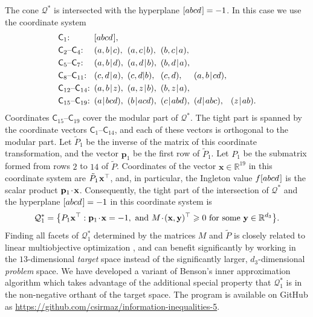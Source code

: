 \documentclass[reqno]{amsart}
\theoremstyle{definition}
\newcommand\tsp{\mkern 1.5mu}
\def\|{\mkern1.5mu{|}\mkern1.5mu}
\renewcommand\ge{\geqslant}\renewcommand\le{\leqslant}
\newcommand\Co{\mathsf C} %
\newcommand\R{\mathbb R}  %
\newcommand\T{\top}       %
\def\m#1{\tsp{#1}\tsp}
\def\abcd{[abcd\tsp]}
\begin{document}
The cone $\mathcal Q^*$ is intersected with the hyperplane $\abcd=-1$.
In this case we use the coordinate system
$$\mathcode`\:="3A\setlength\arraycolsep{2.5pt}%
\begin{array}{llllll}
 \Co_1: & \abcd, \\[3pt]
 \Co_2\mbox{--}\Co_4: & (a,b\|c), & (a,c\|b), & (b,c\|a), \\[3pt]
 \Co_5\mbox{--}\Co_7: & (a,b\|d), & (a,d\|b), & (b,d\|a), \\[3pt]
 \Co_8\mbox{--}\Co_{11}: & (c,d\|a), & (c,d|b),& (c,d), & (a,b\|cd), \\[3pt]
 \Co_{12}\mbox{--}\Co_{14}:& (a,b\|z), & (a,z\|b), & (b,z\|a), \\[3pt]
 \Co_{15}\mbox{--}\Co_{19}: & (a\|bcd), & (b\|acd), & (c\|abd), 
   & (d\|abc), & (z\|ab).
\end{array}$$
Coordinates $\Co_{15}\mbox{--}\Co_{19}$ cover the modular part of $\mathcal
Q^*$. The tight part is spanned by the coordinate vectors
$\Co_1\mbox{--}\Co_{14}$, and each of these vectors is orthogonal to the
modular part. Let $\tilde P_1$ be the inverse of the matrix of this
coordinate transformation, and the vector $\mathbf p_1$ be the first row of
$\tilde P_1$. Let $P_1$ be the submatrix formed from rows $2$ to $14$ of
$\tilde P$. Coordinates of the vector $\mathbf x\in\R^{19}$ in this
coordinate system are $\tilde P_1\tsp \mathbf x^\T$, and, in particular, the
Ingleton value $f\abcd$ is the scalar product $\mathbf p_1\m\cdot \mathbf
x$. Consequently, the tight part of the intersection of $\mathcal Q^*$ and
the hyperplane $\abcd=-1$ in this coordinate system is
\begin{equation}\label{eq:Q1}
   \mathcal Q^*_1 = \big\{ P_1\mathbf x^\T:
            \mathbf p_1\m\cdot\mathbf x=-1, \mbox{ and }
            M\m\cdot (\mathbf x,\mathbf y)^\T \ge 0
            \mbox{ for some }\mathbf y\in\R^{d_3} \big\}.
\end{equation}
Finding all facets of $\mathcal Q^*_1$ determined by the matrices $M$ and
$\tilde P$ is closely related to linear multiobjective optimization
\cite{impossible}, and can benefit significantly by working in the
$13$-dimensional \emph{target} space \cite{ehrgott} instead of the
significantly larger, $d_3$-dimensional \emph{problem} space. We have
developed a variant of Benson's inner approximation algorithm
\cite{inner,bensolve} which takes advantage of the additional special
property that $\mathcal Q^*_1$ is in the non-negative orthant of the target
space. The program is available on GitHub as
\url{https://github.com/csirmaz/information-inequalities-5}.
\end{document}
